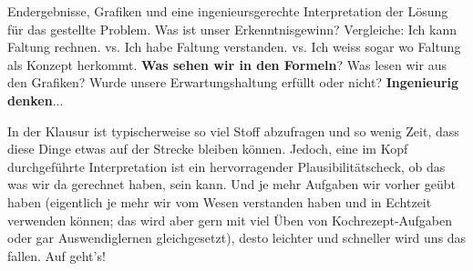 \begin{Loesung}
Endergebnisse, Grafiken und eine ingenieursgerechte Interpretation der Lösung
für das gestellte Problem.
%
Was ist unser Erkenntnisgewinn?
%
Vergleiche: Ich kann Faltung rechnen. vs. Ich habe Faltung verstanden. vs. Ich weiss sogar wo Faltung als Konzept herkommt.
%
\textbf{Was sehen wir in den Formeln}?
%
Was lesen wir aus den Grafiken?
%
Wurde unsere Erwartungshaltung erfüllt oder nicht? \textbf{Ingenieurig denken}...

In der Klausur ist typischerweise so viel Stoff abzufragen und so wenig Zeit,
dass diese Dinge etwas auf der Strecke bleiben können. Jedoch, eine im Kopf
durchgeführte Interpretation ist ein hervorragender Plausibilitätscheck, ob das was
wir da gerechnet haben, sein kann. Und je mehr Aufgaben wir
vorher geübt haben (eigentlich je mehr wir vom Wesen verstanden haben und in
Echtzeit verwenden können; das wird aber gern mit viel Üben von Kochrezept-Aufgaben oder gar
Auswendiglernen gleichgesetzt),
desto leichter und schneller wird uns das fallen.
%
Auf geht's!
\end{Loesung}

